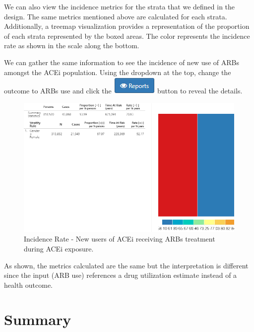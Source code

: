\documentclass[11pt]{book}
\theoremstyle{definition}
\theoremstyle{definition}
\theoremstyle{definition}
\theoremstyle{remark}
\begin{document}
We can also view the incidence metrics for the strata that we defined in the design. The same metrics mentioned above are calculated for each strata. Additionally, a treemap visualization provides a representation of the proportion of each strata represented by the boxed areas. The color represents the incidence rate as shown in the scale along the bottom.

We can gather the same information to see the incidence of new use of ARBs amongst the ACEi population. Using the dropdown at the top, change the outcome to ARBs use and click the \includegraphics{images/Characterization/atlasIncidenceReportButton.png} button to reveal the details.

\begin{figure}

{\centering \includegraphics[width=1\linewidth]{images/Characterization/atlasIncidenceResultsARB} 

}

\caption{Incidence Rate - New users of ACEi receiving ARBs treatment during ACEi exposure.}\label{fig:atlasIncidenceResultsARB}
\end{figure}

As shown, the metrics calculated are the same but the interpretation is different since the input (ARB use) references a drug utilization estimate instead of a health outcome.

\hypertarget{summary-6}{%
\section{Summary}\label{summary-6}}
\end{document}
